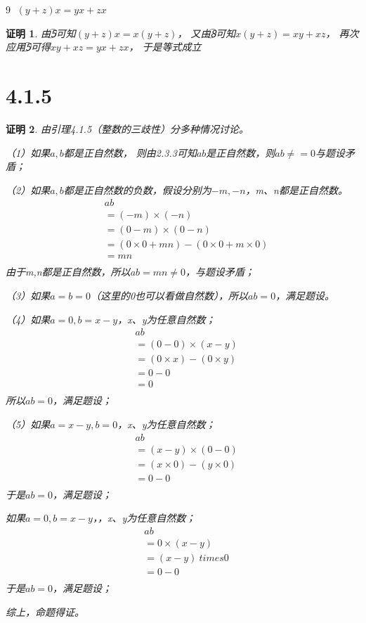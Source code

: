 \documentclass{article}
\theoremstyle{mystyle}
\theoremstyle{zproofstyle}
\newtheorem*{zproof}{证明}
\begin{document}
\textcircled{9} $(y+z)x = yx+zx$

\begin{zproof}
  由\textcircled{5}可知$(y+z)x=x(y+z)$，
  又由\textcircled{8}可知$x(y+z)=xy+xz$，
  再次应用\textcircled{5}可得$xy+xz=yx+zx$，
  于是等式成立
\end{zproof}

\section*{4.1.5}

\begin{zproof}
  由引理4.1.5（整数的三歧性）分多种情况讨论。

  （1）如果$a,b$都是正自然数，
  则由2.3.3可知$ab$是正自然数，则$ab \neq = 0$与题设矛盾；

  （2）如果$a,b$都是正自然数的负数，假设分别为$-m,-n$，m、n都是正自然数。
  \begin{align*}
     & ab                                              \\
     & = (-m) \times (-n)                              \\
     & = (0-m) \times (0-n)                            \\
     & = (0 \times 0 + mn) - (0 \times 0 + m \times 0) \\
     & = mn                                            \\
  \end{align*}
  由于m,n都是正自然数，所以$ab=mn \neq 0$，与题设矛盾；

  （3）如果$a=b=0$（这里的0也可以看做自然数），所以$ab=0$，满足题设。

  （4）如果$a=0,b=x-y$，x、y为任意自然数；
  \begin{align*}
     & ab                            \\
     & = (0-0) \times (x-y)          \\
     & = (0 \times x) - (0 \times y) \\
     & = 0 - 0                       \\
     & = 0                           \\
  \end{align*}
  所以$ab=0$，满足题设；

  （5）如果$a=x-y,b=0$，x、y为任意自然数；
  \begin{align*}
     & ab                            \\
     & = (x-y) \times (0-0)          \\
     & = (x \times 0) - (y \times 0) \\
     & = 0 - 0                       \\
  \end{align*}
  于是$ab=0$，满足题设；

  如果$a=0,b=x-y$，，x、y为任意自然数；
  \begin{align*}
     & ab                \\
     & = 0 \times (x-y)  \\
     & = (x-y) \ times 0 \\
     & = 0 - 0           \\
  \end{align*}
  于是$ab=0$，满足题设；

  综上，命题得证。
\end{zproof}
\end{document}
